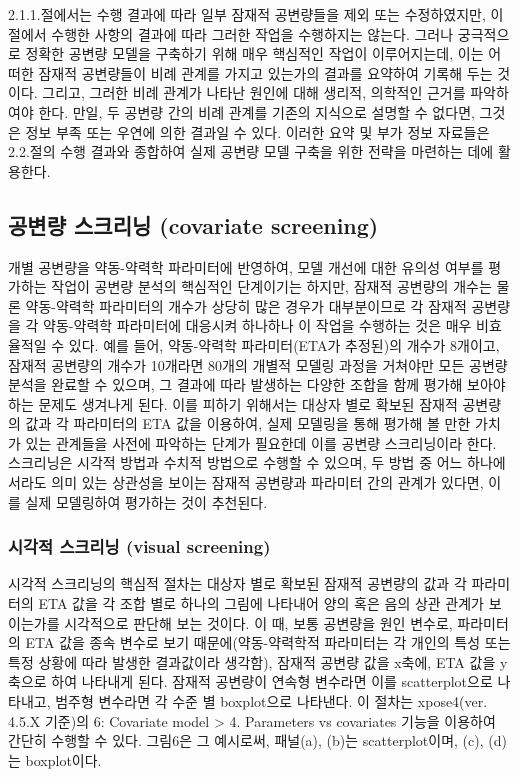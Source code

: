\documentclass[
  10pt,
]{krantz}
\begin{document}
2.1.1.절에서는 수행 결과에 따라 일부 잠재적 공변량들을 제외 또는 수정하였지만, 이 절에서 수행한 사항의 결과에 따라 그러한
작업을 수행하지는 않는다. 그러나 궁극적으로 정확한 공변량 모델을 구축하기 위해 매우 핵심적인 작업이 이루어지는데, 이는 어떠한
잠재적 공변량들이 비례 관계를 가지고 있는가의 결과를 요약하여 기록해 두는 것이다. 그리고, 그러한 비례 관계가 나타난 원인에
대해 생리적, 의학적인 근거를 파악하여야 한다. 만일, 두 공변량 간의 비례 관계를 기존의 지식으로 설명할 수 없다면, 그것은
정보 부족 또는 우연에 의한 결과일 수 있다. 이러한 요약 및 부가 정보 자료들은 2.2.절의 수행 결과와 종합하여 실제
공변량 모델 구축을 위한 전략을 마련하는 데에 활용한다.

\hypertarget{uxacf5uxbcc0uxb7c9-uxc2a4uxd06cuxb9acuxb2dd-covariate-screening}{%
\subsection{공변량 스크리닝 (covariate screening)}\label{uxacf5uxbcc0uxb7c9-uxc2a4uxd06cuxb9acuxb2dd-covariate-screening}}

개별 공변량을 약동-약력학 파라미터에 반영하여, 모델 개선에 대한 유의성 여부를 평가하는 작업이 공변량 분석의 핵심적인 단계이기는
하지만, 잠재적 공변량의 개수는 물론 약동-약력학 파라미터의 개수가 상당히 많은 경우가 대부분이므로 각 잠재적 공변량을 각
약동-약력학 파라미터에 대응시켜 하나하나 이 작업을 수행하는 것은 매우 비효율적일 수 있다. 예를 들어, 약동-약력학
파라미터(ETA가 추정된)의 개수가 8개이고, 잠재적 공변량의 개수가 10개라면 80개의 개별적 모델링 과정을 거쳐야만 모든
공변량 분석을 완료할 수 있으며, 그 결과에 따라 발생하는 다양한 조합을 함께 평가해 보아야 하는 문제도 생겨나게 된다. 이를
피하기 위해서는 대상자 별로 확보된 잠재적 공변량의 값과 각 파라미터의 ETA 값을 이용하여, 실제 모델링을 통해 평가해 볼 만한
가치가 있는 관계들을 사전에 파악하는 단계가 필요한데 이를 공변량 스크리닝이라 한다. 스크리닝은 시각적 방법과 수치적 방법으로
수행할 수 있으며, 두 방법 중 어느 하나에서라도 의미 있는 상관성을 보이는 잠재적 공변량과 파라미터 간의 관계가 있다면,
이를 실제 모델링하여 평가하는 것이 추천된다.

\hypertarget{uxc2dcuxac01uxc801-uxc2a4uxd06cuxb9acuxb2dd-visual-screening}{%
\subsubsection{시각적 스크리닝 (visual screening)}\label{uxc2dcuxac01uxc801-uxc2a4uxd06cuxb9acuxb2dd-visual-screening}}

시각적 스크리닝의 핵심적 절차는 대상자 별로 확보된 잠재적 공변량의 값과 각 파라미터의 ETA 값을 각 조합 별로 하나의 그림에
나타내어 양의 혹은 음의 상관 관계가 보이는가를 시각적으로 판단해 보는 것이다. 이 때, 보통 공변량을 원인 변수로,
파라미터의 ETA 값을 종속 변수로 보기 때문에(약동-약력학적 파라미터는 각 개인의 특성 또는 특정 상황에 따라
발생한 결과값이라 생각함), 잠재적 공변량 값을 x축에, ETA 값을 y축으로 하여 나타내게 된다. 잠재적 공변량이 연속형
변수라면 이를 scatterplot으로 나타내고, 범주형 변수라면 각 수준 별 boxplot으로 나타낸다. 이
절차는 xpose4(ver. 4.5.X 기준)의 6: Covariate model \textgreater{} 4. Parameters vs
covariates 기능을 이용하여 간단히 수행할 수 있다. 그림6은 그 예시로써, 패널(a), (b)는
scatterplot이며, (c), (d)는 boxplot이다.
\end{document}
